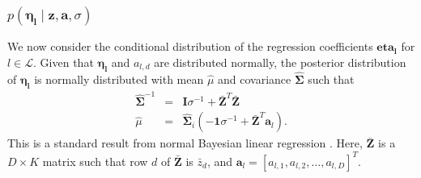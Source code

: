 \documentclass{article}
\begin{document}
\subsubsection{$p\left(\mathbf{\eta_l}\mid\mathbf{z},\mathbf{a},\sigma\right)$}
%
We now consider the conditional distribution of the regression coefficients $\mathbf{eta_l}$ for $l \in \mathcal{L}$.  Given that $\mathbf{\eta_l}$ and $a_{l,d}$ are distributed normally, the posterior distribution of $\mathbf{\eta_l}$ is normally distributed with mean $\hat \mu$ and covariance $\hat{\mathbf{\Sigma}}$ such that
\begin{eqnarray}
\hat{\mathbf{\Sigma}}^{-1} &=&\mathbf{I}\sigma^{-1}+\bar{\mathbf{Z}}^{T}\bar{\mathbf{Z}} \\
\hat \mu &=&\hat{\mathbf{\Sigma}}_{i}\left(-\mathbf{1}\sigma^{-1}+\bar{\mathbf{Z}}^{T}\mathbf{a}_l\right). 
\end{eqnarray}
This is a standard result from normal Bayesian linear regression \citep{BishopPRML}.  Here, $\bar{\mathbf{Z}}$ is a $D \times K$ matrix such that row $d$ of $\mathbf{\bar Z}$ is $\bar z_d$, and $\mathbf{a}_l = [a_{l,1}, a_{l,2}, \ldots, a_{l,D}]^T$.
%
%
%
%
%
%
%
\end{document}

